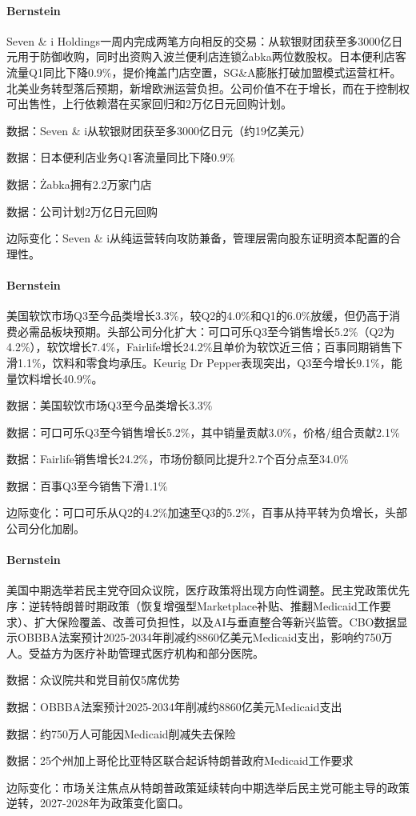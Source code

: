 \documentclass[11pt]{ctexart}
\begin{document}
\paragraph{Bernstein} Seven \& i Holdings一周内完成两笔方向相反的交易：从软银财团获至多3000亿日元用于防御收购，同时出资购入波兰便利店连锁Żabka两位数股权。日本便利店客流量Q1同比下降0.9\%，提价掩盖门店空置，SG\&A膨胀打破加盟模式运营杠杆。北美业务转型落后预期，新增欧洲运营负担。公司价值不在于增长，而在于控制权可出售性，上行依赖潜在买家回归和2万亿日元回购计划。
{\small\color{refgray}数据：Seven \& i从软银财团获至多3000亿日元（约19亿美元）\par}
{\small\color{refgray}数据：日本便利店业务Q1客流量同比下降0.9\%\par}
{\small\color{refgray}数据：Żabka拥有2.2万家门店\par}
{\small\color{refgray}数据：公司计划2万亿日元回购\par}
{\small\color{refgray}边际变化：Seven \& i从纯运营转向攻防兼备，管理层需向股东证明资本配置的合理性。\par}
\paragraph{Bernstein} 美国软饮市场Q3至今品类增长3.3\%，较Q2的4.0\%和Q1的6.0\%放缓，但仍高于消费必需品板块预期。头部公司分化扩大：可口可乐Q3至今销售增长5.2\%（Q2为4.2\%），软饮增长7.4\%，Fairlife增长24.2\%且单价为软饮近三倍；百事同期销售下滑1.1\%，饮料和零食均承压。Keurig Dr Pepper表现突出，Q3至今增长9.1\%，能量饮料增长40.9\%。
{\small\color{refgray}数据：美国软饮市场Q3至今品类增长3.3\%\par}
{\small\color{refgray}数据：可口可乐Q3至今销售增长5.2\%，其中销量贡献3.0\%，价格/组合贡献2.1\%\par}
{\small\color{refgray}数据：Fairlife销售增长24.2\%，市场份额同比提升2.7个百分点至34.0\%\par}
{\small\color{refgray}数据：百事Q3至今销售下滑1.1\%\par}
{\small\color{refgray}边际变化：可口可乐从Q2的4.2\%加速至Q3的5.2\%，百事从持平转为负增长，头部公司分化加剧。\par}
\paragraph{Bernstein} 美国中期选举若民主党夺回众议院，医疗政策将出现方向性调整。民主党政策优先序：逆转特朗普时期政策（恢复增强型Marketplace补贴、推翻Medicaid工作要求）、扩大保险覆盖、改善可负担性，以及AI与垂直整合等新兴监管。CBO数据显示OBBBA法案预计2025-2034年削减约8860亿美元Medicaid支出，影响约750万人。受益方为医疗补助管理式医疗机构和部分医院。
{\small\color{refgray}数据：众议院共和党目前仅5席优势\par}
{\small\color{refgray}数据：OBBBA法案预计2025-2034年削减约8860亿美元Medicaid支出\par}
{\small\color{refgray}数据：约750万人可能因Medicaid削减失去保险\par}
{\small\color{refgray}数据：25个州加上哥伦比亚特区联合起诉特朗普政府Medicaid工作要求\par}
{\small\color{refgray}边际变化：市场关注焦点从特朗普政策延续转向中期选举后民主党可能主导的政策逆转，2027-2028年为政策变化窗口。\par}
\end{document}
